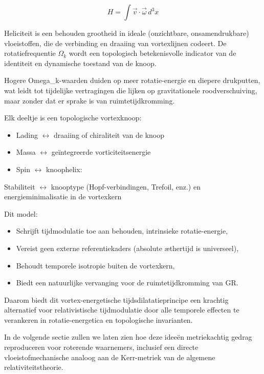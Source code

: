 \begin{equation}
H = \int \vec{v} \cdot \vec{\omega} \, d^3x \label{eq:helicity_rotation}
\end{equation}

Heliciteit is een behouden grootheid in ideale (onzichtbare, onsamendrukbare) vloeistoffen, die de verbinding en draaiing van vortexlijnen codeert. De rotatiefrequentie $\Omega_k$ wordt een topologisch betekenisvolle indicator van de identiteit en dynamische toestand van de knoop.

Hogere Omega_k-waarden duiden op meer rotatie-energie en diepere drukputten, wat leidt tot tijdelijke vertragingen die lijken op gravitationele roodverschuiving, maar zonder dat er sprake is van ruimtetijdkromming.

Elk deeltje is een topologische vortexknoop:
\begin{itemize}
\item Lading $\leftrightarrow$ draaiing of chiraliteit van de knoop
\item Massa $\leftrightarrow$ geïntegreerde vorticiteitsenergie
\item Spin $\leftrightarrow$ knoophelix:
\end{itemize}
Stabiliteit $\leftrightarrow$ knooptype (Hopf-verbindingen, Trefoil, enz.) en energieminimalisatie in de vortexkern

Dit model:

\begin{itemize}
\item Schrijft tijdmodulatie toe aan behouden, intrinsieke rotatie-energie,
\item Vereist geen externe referentiekaders (absolute æthertijd is universeel),
\item Behoudt temporele isotropie buiten de vortexkern,
\item Biedt een natuurlijke vervanging voor de ruimtetijdkromming van GR. \end{itemize}

Daarom biedt dit vortex-energetische tijdsdilatatieprincipe een krachtig alternatief voor relativistische tijdmodulatie door alle temporele effecten te verankeren in rotatie-energetica en topologische invarianten.

In de volgende sectie zullen we laten zien hoe deze ideeën metriekachtig gedrag reproduceren voor roterende waarnemers, inclusief een directe vloeistofmechanische analoog aan de Kerr-metriek van de algemene relativiteitstheorie.